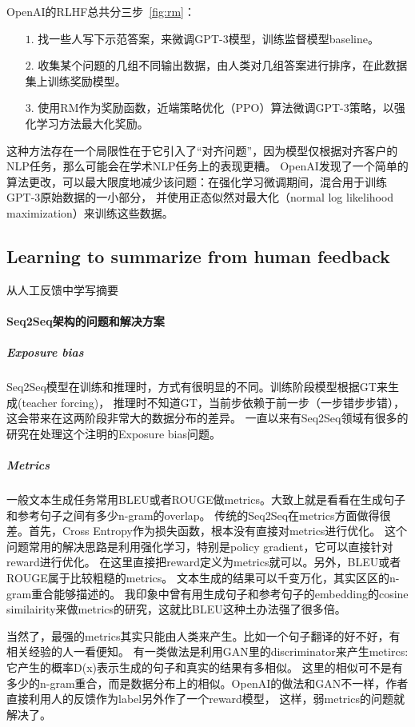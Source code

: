 \documentclass[UTF8]{ctexart}
\begin{document}
    OpenAI的RLHF总共分三步~\ref{fig:rm}：
    \begin{itemize}
        \item[$1.$] 找一些人写下示范答案，来微调GPT-3模型，训练监督模型baseline。
        \item[$2.$] 收集某个问题的几组不同输出数据，由人类对几组答案进行排序，在此数据集上训练奖励模型。
        \item[$3.$] 使用RM作为奖励函数，近端策略优化（PPO）算法微调GPT-3策略，以强化学习方法最大化奖励。
    \end{itemize}

    这种方法存在一个局限性在于它引入了“对齐问题”，因为模型仅根据对齐客户的NLP任务，那么可能会在学术NLP任务上的表现更糟。
    OpenAI发现了一个简单的算法更改，可以最大限度地减少该问题：在强化学习微调期间，混合用于训练GPT-3原始数据的一小部分，
    并使用正态似然对最大化（normal log likelihood maximization）来训练这些数据。

    \subsection{Learning to summarize from human feedback~\cite{ref_human}}
    从人工反馈中学写摘要
    \paragraph{Seq2Seq架构的问题和解决方案}

    \subparagraph{Exposure bias}
    Seq2Seq模型在训练和推理时，方式有很明显的不同。训练阶段模型根据GT来生成(teacher forcing)，
    推理时不知道GT，当前步依赖于前一步（一步错步步错），这会带来在这两阶段非常大的数据分布的差异。
    一直以来有Seq2Seq领域有很多的研究在处理这个注明的Exposure bias问题。

    \subparagraph{Metrics}
    一般文本生成任务常用BLEU或者ROUGE做metrics。大致上就是看看在生成句子和参考句子之间有多少n-gram的overlap。
    传统的Seq2Seq在metrics方面做得很差。首先，Cross Entropy作为损失函数，根本没有直接对metrics进行优化。
    这个问题常用的解决思路是利用强化学习，特别是policy gradient，它可以直接针对reward进行优化。
    在这里直接把reward定义为metrics就可以。另外，BLEU或者ROUGE属于比较粗糙的metrics。
    文本生成的结果可以千变万化，其实区区的n-gram重合能够描述的。
    我印象中曾有用生成句子和参考句子的embedding的cosine similairity来做metrics的研究，这就比BLEU这种土办法强了很多倍。

    当然了，最强的metrics其实只能由人类来产生。比如一个句子翻译的好不好，有相关经验的人一看便知。
    有一类做法是利用GAN里的discriminator来产生metircs:它产生的概率D(x)表示生成的句子和真实的结果有多相似。
    这里的相似可不是有多少的n-gram重合，而是数据分布上的相似。OpenAI的做法和GAN不一样，作者直接利用人的反馈作为label另外作了一个reward模型，
    这样，弱metrics的问题就解决了。
\end{document}
